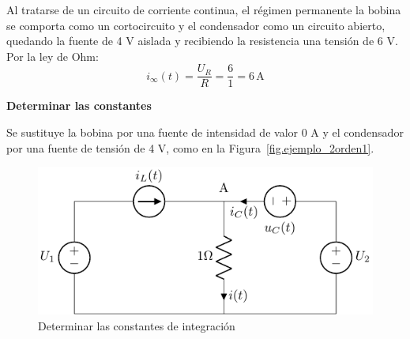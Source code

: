 \begin{example}
	    Al tratarse de un circuito de corriente continua, el régimen permanente la bobina se comporta como un cortocircuito y el condensador como un circuito abierto, quedando la fuente de 4 V aislada y recibiendo la resistencia una tensión de 6 V. Por la ley de Ohm:
	    \begin{equation*}
	        i_\infty(t)=\dfrac{U_R}{R}=\dfrac{6}{1}=6\,\text{A}
	    \end{equation*}
	    
	    \textbf{Determinar las constantes}
	    
	    Se sustituye la bobina por una fuente de intensidad de valor 0 A y el condensador por una fuente de tensión de 4 V, como en la Figura~\ref{fig.ejemplo_2orden1}.
	    \begin{figure}[H]
	        \centering
	        \includegraphics[width=0.45\linewidth]{../figs/ejemplo_2orden2.pdf}
	        \caption{Determinar las constantes de integración}
	        \label{fig.ejemplo_2orden2}
	    \end{figure}
	    

\end{example}
